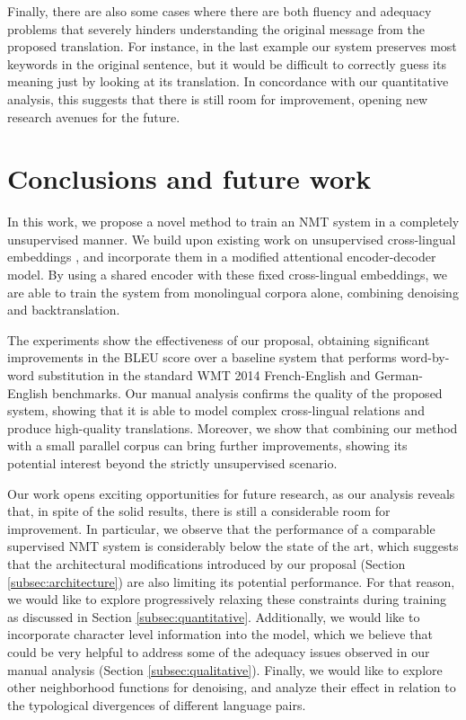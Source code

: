 \documentclass{article} \usepackage{iclr2018_conference,times}
\begin{document}
Finally, there are also some cases where there are both fluency and adequacy problems that severely hinders understanding the original message from the proposed translation. For instance, in the last example our system preserves most keywords in the original sentence, but it would be difficult to correctly guess its meaning just by looking at its translation. In concordance with our quantitative analysis, this suggests that there is still room for improvement, opening new research avenues for the future.


\section{Conclusions and future work} \label{sec:conclusions}

In this work, we propose a novel method to train an NMT system in a completely unsupervised manner. We build upon existing work on unsupervised cross-lingual embeddings \citep{artetxe2017learning,zhang2017adversarial},
and incorporate them in a modified attentional encoder-decoder model. By using a shared encoder with these fixed cross-lingual embeddings, we are able to train the system from monolingual corpora alone, combining denoising and backtranslation.

The experiments show the effectiveness of our proposal, obtaining significant improvements in the BLEU score over a baseline system that performs word-by-word substitution in the standard WMT 2014 French-English and German-English benchmarks. Our manual analysis confirms the quality of the proposed system, showing that it is able to model complex cross-lingual relations and produce high-quality translations. Moreover, we show that combining our method with a small parallel corpus can bring further improvements, showing its potential interest beyond the strictly unsupervised scenario.

Our work opens exciting opportunities for future research, as our analysis reveals that, in spite of the solid results, there is still a considerable room for improvement. In particular, we observe that the performance of a comparable supervised NMT system is considerably below the state of the art, which suggests that the architectural modifications introduced by our proposal (Section \ref{subsec:architecture}) are also limiting its potential performance. For that reason, we would like to explore progressively relaxing these constraints during training as discussed in Section \ref{subsec:quantitative}. Additionally, we would like to incorporate character level information into the model, which we believe that could be very helpful to address some of the adequacy issues observed in our manual analysis (Section \ref{subsec:qualitative}). Finally, we would like to explore other neighborhood functions for denoising, and analyze their effect in relation to the typological divergences of different language pairs.
\end{document}

